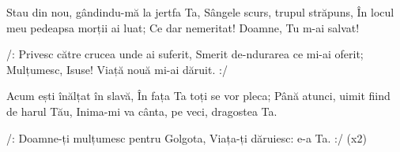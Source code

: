 \beginverse
Stau din nou, gândindu-mă la jertfa Ta,
Sângele scurs, trupul străpuns,
În locul meu pedeapsa morții ai luat;
Ce dar nemeritat! Doamne, Tu m-ai salvat!
\endverse

\beginchorus
/: Privesc către crucea unde ai suferit,
Smerit de-ndurarea ce mi-ai oferit;
Mulțumesc, Isuse! Viață nouă mi-ai dăruit. :/
\endchorus

\beginverse
Acum ești înălțat în slavă,
În fața Ta toți se vor pleca;
Până atunci, uimit fiind de harul Tău,
Inima-mi va cânta, pe veci, dragostea Ta.
\endverse

\beginverse*
/: Doamne-ți mulțumesc pentru Golgota,
Viața-ți dăruiesc: e-a Ta. :/ (x2)
\endverse
\endsong
